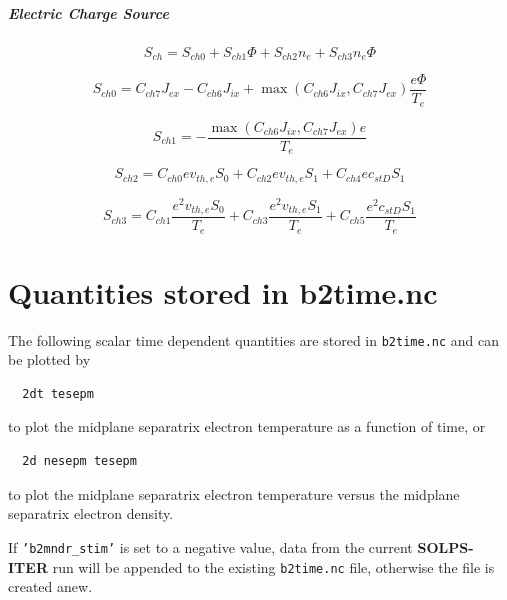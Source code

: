 \documentclass[a4paper,10pt]{report}
\newcommand\SOLPSITER{{\bf SOLPS-ITER} }
\begin{document}
\paragraph{Electric Charge Source}

\begin{equation}
S_{ch}=S_{ch0}+S_{ch1}\Phi+S_{ch2}n_{e}+S_{ch3}n_{e}\Phi   \label{108}
\end{equation}

\begin{equation}
S_{ch0}=C_{ch7}J_{ex}-C_{ch6}J_{ix}+
\max\left(C_{ch6}J_{ix},C_{ch7}J_{ex}\right) \frac{e\Phi}{T_{e}}
\label{109}
\end{equation}
\bigskip

\begin{equation}
S_{ch1}=-\frac{\max\left( C_{ch6}J_{ix},C_{ch7}J_{ex}\right) e}{T_{e}}   \label{110}
\end{equation}

\begin{equation}
S_{ch2}=C_{ch0}ev_{th,e}S_{0}+C_{ch2}ev_{th,e}S_{1}+C_{ch4}ec_{stD}S_{1}
\label{111}
\end{equation}

\begin{equation}
S_{ch3}=C_{ch1}\frac{e^{2}v_{th,e}S_{0}}{T_{e}}+C_{ch3}
\frac{e^{2}v_{th,e}S_{1}}{T_{e}}+C_{ch5}\frac{e^{2}c_{stD}S_{1}}{T_{e}}   \label{112}
\end{equation}

\clearpage

\chapter{Quantities stored in b2time.nc}
\label{cha:b2time}

The following scalar time dependent quantities are stored in
{\tt b2time.nc} and can be plotted by
\begin{verbatim}
  2dt tesepm
\end{verbatim}
to plot the midplane separatrix electron temperature as a function of
time, or
\begin{verbatim}
  2d nesepm tesepm
\end{verbatim}
to plot the midplane separatrix electron temperature versus the midplane separatrix electron density.

If {\tt 'b2mndr\_stim'} is set to a negative value, data from the current \SOLPSITER run will be appended to the existing {\tt b2time.nc} file, otherwise the file is created anew.
\end{document}
